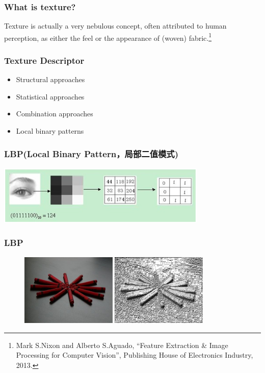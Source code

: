 \documentclass[notheorems,serif,table,compress]{beamer}  %
\begin{document}
\begin{frame}
\frametitle{What is texture?}
Texture is actually a very nebulous concept, often attributed to human perception, as either the feel or the appearance of (woven) fabric.\footnote{Mark S.Nixon and Alberto S.Aguado, ``Feature Extraction \& Image Processing for Computer Vision'', Publishing House of Electronics Industry, 2013.}
\end{frame}


\begin{frame}
\frametitle{Texture Descriptor}
\begin{itemize}
\item Structural approaches
\item Statistical approaches
\item Combination approaches
\item Local binary patterns
\end{itemize}
\end{frame}


\begin{frame}
\frametitle{LBP(Local Binary Pattern，局部二值模式)}
\centering\includegraphics[width=10cm]{LBP.png}
\end{frame}


\begin{frame}
\frametitle{LBP}
  \begin{figure}[!ht]
  \begin{minipage}[t]{0.46\textwidth}
  \includegraphics[width=1.8in]{example1.jpg}
  \end{minipage}
  \begin{minipage}[t]{0.46\textwidth}
  \includegraphics[width=1.8in]{LBP1.png}
  \end{minipage}
  \end{figure} 
\end{frame}
\end{document}
